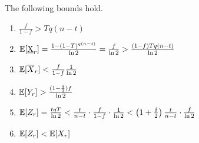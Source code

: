\begin{lemma}\label{lem:expectation-bounds}
  The following bounds hold.
  \begin{enumerate}
    \item $\frac{f}{1 - f} > Tq(n - t)$
    \item $\mathop{{}\mathbb{E}}[\underbar{X}_r] = \frac{1 - (1 - T)^{q(n - t)}}{\ln2} = \frac{f}{\ln2}
            > \frac{(1 - f)Tq(n - t)}{\ln2}$ \label{eq.ex-underbar-x-bound}
    \item $\mathop{{}\mathbb{E}}[\overline{X}_r] < \frac{f}{1 - f}\frac{1}{\ln2}$
    \item $\mathop{{}\mathbb{E}}[Y_r] > \frac{(1 - \frac{\delta}{3})f}{\ln2}$\label{eq.ex-y-bound}
    \item $\mathop{{}\mathbb{E}}[Z_r] = \frac{tqT}{\ln2} < \frac{t}{n - t} \cdot \frac{f}{1 - f} \cdot \frac{1}{\ln2}  < \left(1 + \frac{\delta}{2}\right)\frac{t}{n - t} \cdot \frac{f}{\ln2}$\label{eq.ex-z-bound}
    \item $\mathop{{}\mathbb{E}}[Z_r] < \mathop{{}\mathbb{E}}[X_r]$
  \end{enumerate}
\end{lemma}
